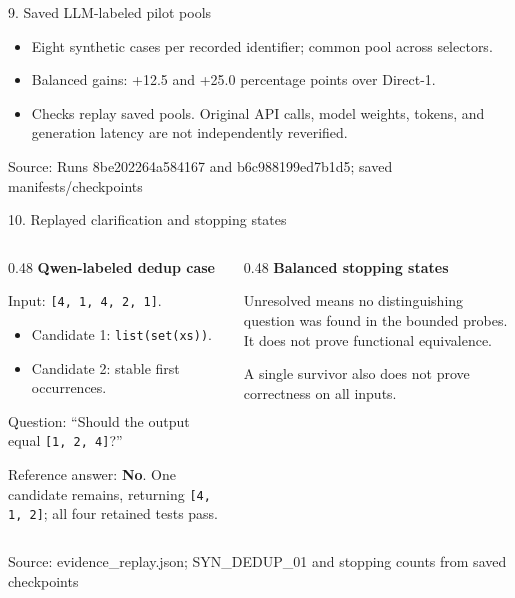 \documentclass[aspectratio=169,10pt]{beamer}
\newcommand{\source}[1]{\par\vfill{\scriptsize\color{gray}Source: #1\par}}
\begin{document}
\begin{frame}{9. Saved LLM-labeled pilot pools}
  \centering
  
  \par\medskip
  \raggedright
  \begin{itemize}
    \item Eight synthetic cases per recorded identifier; common pool across selectors.
    \item Balanced gains: +12.5 and +25.0 percentage points over Direct-1.
    \item Checks replay saved pools. Original API calls, model weights, tokens, and generation latency are not independently reverified.
  \end{itemize}
  \source{Runs 8be202264a584167 and b6c988199ed7b1d5; saved manifests/checkpoints}
\end{frame}

\begin{frame}{10. Replayed clarification and stopping states}
  \begin{columns}[T]
    \begin{column}{0.48\textwidth}
      \textbf{Qwen-labeled dedup case}
      \par\medskip
      Input: \texttt{[4, 1, 4, 2, 1]}.
      \begin{itemize}
        \item Candidate 1: \texttt{list(set(xs))}.
        \item Candidate 2: stable first occurrences.
      \end{itemize}
      \par\medskip
      Question: ``Should the output equal \texttt{[1, 2, 4]}?''
      \par\medskip
      Reference answer: \textbf{No}. One candidate remains, returning \texttt{[4, 1, 2]}; all four retained tests pass.
    \end{column}
    \begin{column}{0.48\textwidth}
      \textbf{Balanced stopping states}
      \par\medskip
      
      \par\medskip
      Unresolved means no distinguishing question was found in the bounded probes. It does not prove functional equivalence.
      \par\medskip
      A single survivor also does not prove correctness on all inputs.
    \end{column}
  \end{columns}
  \source{evidence\_replay.json; SYN\_DEDUP\_01 and stopping counts from saved checkpoints}
\end{frame}
\end{document}
